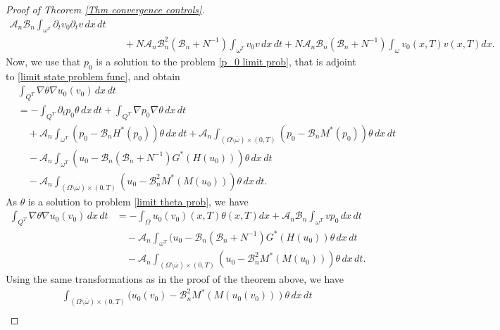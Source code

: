\documentclass[reqno]{amsart}
\begin{document}
\begin{proof}[Proof of Theorem \ref{Thm convergence controls}]
\begin{equation}
\begin{aligned}
\mathcal{A}_n\mathcal{B}_n\int _{\omega ^{T}}\partial
_{t}v_0\partial _{t}v\,dx\,dt    \\
&\quad +N\mathcal{A}_n\mathcal{B}_n^2(\mathcal{B}_n+N^{-1})\int
_{\omega ^{T}}v_0v\,dx\,dt+N\mathcal{A}_n\mathcal{B}_n(\mathcal{B}%
_n+N^{-1})\int _{\omega }v_0(x,T)v(x,T){dx}.
\end{aligned}\label{limit J deriv}
\end{equation}
Now, we use that $p_0$ is a solution to the problem
\eqref{p_0 limit prob}, that is adjoint to \eqref{limit state problem func}, and obtain
\begin{align*}
&\int _{Q^{T}}\nabla \theta \nabla u_0(v_0)\,dx\,dt\\
&=-\int _{Q^{T}}\partial _{t}p_0\theta \,dx\,dt+\int _{Q^{T}}\nabla
p_0\nabla \theta \,dx\,dt \\
&\quad +\mathcal{A}_n\int _{\omega ^{T}}(p_0-\mathcal{B}_nH^{\ast
}(p_0))\theta \,dx\,dt+\mathcal{A}_n\int _{(\Omega \setminus
\overline{\omega })\times (0,T)}(p_0-\mathcal{B}_nM^{\ast
}(p_0))\theta \,dx\,dt \\
&\quad -\mathcal{A}_n\int _{\omega ^{T}}(u_0-\mathcal{B}_n(\mathcal{B}%
_n+N^{-1})G^{\ast }(H(u_0)))\theta \,dx\,dt \\
&\quad -\mathcal{A}_n\int _{(\Omega \setminus \overline{\omega })\times
(0,T)}(u_0-\mathcal{B}_n^2M^{\ast }(M(u_0)))\theta \,dx\,dt.
\end{align*}
As $\theta $ is a solution to  problem \eqref{limit theta prob}, we have
\begin{equation}
\begin{aligned}
\int _{Q^{T}}\nabla \theta \nabla u_0(v_0)\,dx\,dt
&=-\int _{\Omega }u_0(v_0)(x,T)\theta (x,T){dx}+\mathcal{A}_n\mathcal{B}%
_n\int _{\omega ^{T}}vp_0\,dx\,dt    \\
&\quad -\mathcal{A}_n\int _{\omega ^{T}}(u_0-\mathcal{B}_n(\mathcal{B}%
_n+N^{-1})G^{\ast }(H(u_0))\theta \,dx\,dt \\
&\quad -\mathcal{A}_n\int_{(\Omega \setminus \overline{\omega })
 \times (0,T)}(u_0-\mathcal{B} _n^2M^{\ast }(M(u_0)))\theta {\,dx\,dt.}
\end{aligned}  \label{nabla theta rel}
\end{equation}
Using the same transformations as in the proof of the theorem above, we have
\begin{equation}
\begin{aligned}
&\int _{(\Omega \setminus \overline{\omega })\times
(0,T)}(u_0(v_0)-\mathcal{B}_n^2M^{\ast }(M(u_0(v_0)))\theta {\,dx\,dt%
}    \\

\end{aligned}
\end{equation}
\end{proof}
\end{document}
